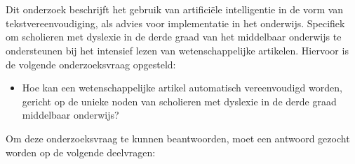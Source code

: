 \section{}%
\label{sec:onderzoeksvraag}

Dit onderzoek beschrijft het gebruik van artificiële intelligentie in de vorm van tekstvereenvoudiging, als advies voor implementatie in het onderwijs. Specifiek om scholieren met dyslexie in de derde graad van het middelbaar onderwijs te ondersteunen bij het intensief lezen van wetenschappelijke artikelen. Hiervoor is de volgende onderzoeksvraag opgesteld: 

\begin{itemize}
	\item Hoe kan een wetenschappelijke artikel automatisch vereenvoudigd worden, gericht op de unieke noden van scholieren met dyslexie in de derde graad middelbaar onderwijs?
\end{itemize}

Om deze onderzoeksvraag te kunnen beantwoorden, moet een antwoord gezocht worden op de volgende deelvragen:

